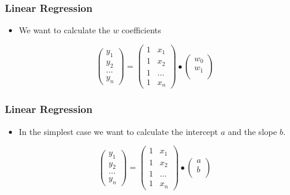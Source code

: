 \documentclass[handout]{beamer}
\begin{document}
\begin{frame}[fragile]
    \frametitle{Linear Regression}
    \Large
    \begin{itemize}
        \item We want to calculate the $w$ coefficients
    \end{itemize}
    \[ 
    \left(
    \begin{array}{c}
        y_1 \\
        y_2 \\
        \ldots \\
        y_n 
    \end{array}
    \right)
    = 
    \left(
    \begin{array}{ccc}
        1 & x_1 \\
        1 & x_2 \\
        1 & \ldots \\
        1 & x_n 
    \end{array}
    \right)
    \bullet
    \left(
    \begin{array}{ccc}
        w_0 \\
        w_1 \\
    \end{array}
    \right)
    \] 
\end{frame}


\begin{frame}[fragile]
    \frametitle{Linear Regression}
    \Large
    \begin{itemize}
        \item In the simplest case we want to calculate the intercept $a$ and the slope $b$.
    \end{itemize}
    \[ 
    \left(
    \begin{array}{c}
        y_1 \\
        y_2 \\
        \ldots \\
        y_n 
    \end{array}
    \right)
    = 
    \left(
    \begin{array}{ccc}
        1 & x_1 \\
        1 & x_2 \\
        1 & \ldots \\
        1 & x_n 
    \end{array}
    \right)
    \bullet
    \left(
    \begin{array}{ccc}
        a \\
        b \\
    \end{array}
    \right)
    \] 
\end{frame}
\end{document}
